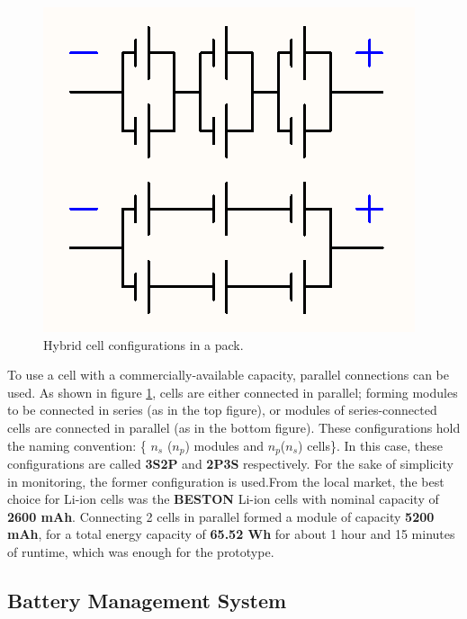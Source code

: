 \begin{figure}[h!]
    \centering
    \includegraphics[scale=0.5]{./Figures/HW/cell-configs.png}
    \caption{Hybrid cell configurations in a pack.}
    \label{fig:hw-cell-config}
\end{figure}


To use a cell with a commercially-available capacity, parallel connections can be used. As shown in figure \ref{fig:hw-cell-config}, cells are either connected in parallel; forming modules to be connected in series (as in the top figure), or modules of series-connected cells are connected in parallel (as in the bottom figure). These configurations hold the naming convention: \{ $n_s$ ($n_p$) modules and $n_p$($n_s$) cells\}. In this case, these configurations are called \textbf{3S2P} and \textbf{2P3S} respectively. For the sake of simplicity in monitoring, the former configuration is used.\newline From the local market, the best choice for Li-ion cells was the \textbf{BESTON} Li-ion cells with nominal capacity of \textbf{2600 mAh}. Connecting 2 cells in parallel formed a module of capacity \textbf{5200 mAh}, for a total energy capacity of \textbf{65.52 Wh} for about 1 hour and 15 minutes of runtime, which was enough for the prototype.
\subsection{Battery Management System}


